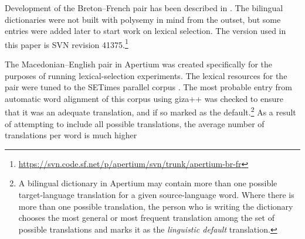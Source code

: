 \documentclass[11pt]{article}
\begin{document}
\begin{description}
\addtolength{\itemsep}{-0.10in}

\item[Breton--French:] Development of the Breton--French pair has been
  described in \citep{tyers10b}. The bilingual %
  dictionaries were not built with polysemy in mind from the outset,
  but some entries were added later to start work on lexical
  selection. The version used in this paper is SVN revision
  41375.\footnote{\url{https://svn.code.sf.net/p/apertium/svn/trunk/apertium-br-fr}}


\item[Macedonian--English:] The Macedonian--English pair
  in Apertium was created specifically for the purposes of running
  lexical-selection experiments. 
  The lexical resources for the pair were tuned to the SETimes parallel corpus
  \citep{tyers10}.  
  The most probable entry from automatic word alignment of this 
  corpus using {\sc giza++} \citep{och03a} was checked to ensure that it was 
  an adequate translation, and if so marked as the 
  default.\footnote{A bilingual dictionary in Apertium
    \citep{forcada2011apertium} may contain more than one possible
    target-language translation for a given source-language
    word. Where there is more than one possible translation, the
    person who is writing the dictionary chooses the most general or
    most frequent translation among the set of possible translations
    and marks it as the \emph{linguistic default} translation.} As a
  result of attempting to include all possible translations, the
  average number of translations per word is much higher %

\end{description}
\end{document}
